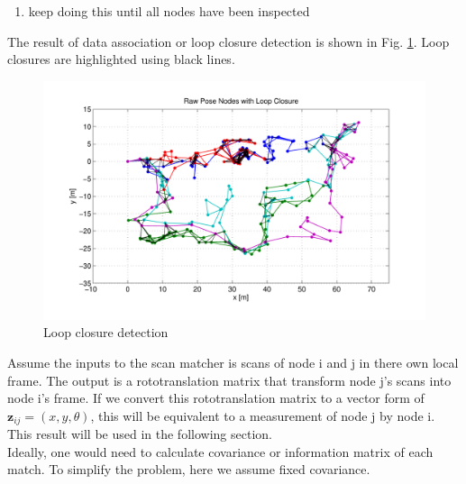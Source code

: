 \documentclass[twoside]{article}
\newcommand{\z}{\mathbf{z}}
\begin{document}
\begin{multicols}{2}
\begin{enumerate}
\item keep doing this until all nodes have been inspected
\end{enumerate}
The result of data association or loop closure detection is shown in Fig. \ref{fig:loop_closure}. Loop closures are highlighted using black lines.
\begin{figure}[H]
\centering
\includegraphics[width=\columnwidth]{fig/loop_closure.pdf}
\caption{Loop closure detection}
\label{fig:loop_closure}
\end{figure}
Assume the inputs to the scan matcher is scans of node i and j in there own local frame. The output is a rototranslation matrix that transform node j's scans into node i's frame. If we convert this rototranslation matrix to a vector form of $\z_{ij} = (x, y, \theta)$, this will be equivalent to a measurement of node j by node i. This result will be used in the following section.\\
Ideally, one would need to calculate covariance or information matrix of each match. To simplify the problem, here we assume fixed covariance.


\end{multicols}
\end{document}
